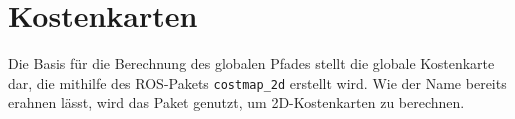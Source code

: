 \section{Kostenkarten}
Die Basis für die Berechnung des globalen Pfades stellt die globale Kostenkarte dar, die mithilfe des ROS-Pakets \lstinline{costmap_2d} \cite{WikiCostmap2D} erstellt wird. Wie der Name bereits erahnen lässt, wird das Paket genutzt, um 2D-Kostenkarten zu berechnen. 
